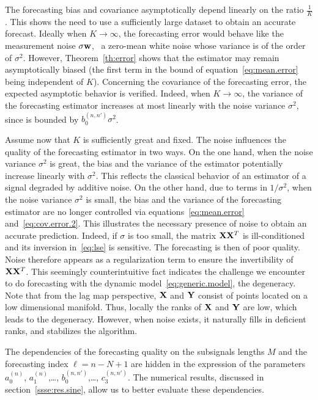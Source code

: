The forecasting bias and covariance asymptotically depend linearly on the ratio $\frac{1}{K}$. This shows the need to use a sufficiently large dataset to obtain an accurate forecast. Ideally when $K\to\infty$, the forecasting error would behave like the measurement noise $\sigma{\mathbf w}$, \ie~a zero-mean white noise whose variance is of the order of $\sigma^2$. However, Theorem~\ref{th:error} shows that the estimator may remain asymptotically biased (the first term in the bound of equation~\eqref{eq:mean.error} being independent of $K$). Concerning the covariance of the forecasting error, the expected asymptotic behavior is verified. Indeed, when $K \to\infty$, the variance of the forecasting estimator increases at most linearly with the noise variance $\sigma^2$, since is bounded by $b_0^{(n,n')}\sigma^2$.

Assume now that $K$ is sufficiently great and fixed. The noise influences the quality of the forecasting estimator in two ways. On the one hand, when the noise variance $\sigma^2$ is great, the bias and the variance of the estimator potentially increase linearly with $\sigma^2$. This reflects the classical behavior of an estimator of a signal degraded by additive noise. On the other hand, due to terms in $1/\sigma^2$, when the noise variance $\sigma^2$ is small, the bias and the variance of the forecasting estimator are no longer controlled via equations~\eqref{eq:mean.error} and~\eqref{eq:cov.error.2}. This illustrates the necessary presence of noise to obtain an accurate prediction. Indeed, if $\sigma$ is too small, the matrix ${\mathbf X}{\mathbf X}^T$ is ill-conditioned and its inversion in~\eqref{eq:lse} is sensitive. The forecasting is then of poor quality. Noise therefore appears as a regularization term to ensure the invertibility of ${\mathbf X}{\mathbf X}^T$. This seemingly counterintuitive fact indicates the challenge we encounter to do forecasting with the dynamic model~\eqref{eq:generic.model}, the degeneracy. Note that from the lag map perspective, ${\mathbf X}$ and ${\mathbf Y}$ consist of points located on a low dimensional manifold. Thus, locally the ranks of ${\mathbf X}$ and ${\mathbf Y}$ are low, which leads to the degeneracy. However, when noise exists, it naturally fills in deficient ranks, and stabilizes the algorithm. 


The dependencies of the forecasting quality on the subsignals lengths $M$ and the forecasting index $\ell=n-N+1$ are hidden in the expression of the parameters $a^{(n)}_0$, $a^{(n)}_1$,\dots, $b^{(n,n')}_0$,\dots, $c^{(n,n')}_3$. The numerical results, discussed in section~\ref{ssse:res.sine}, allow us to better evaluate these dependencies.


